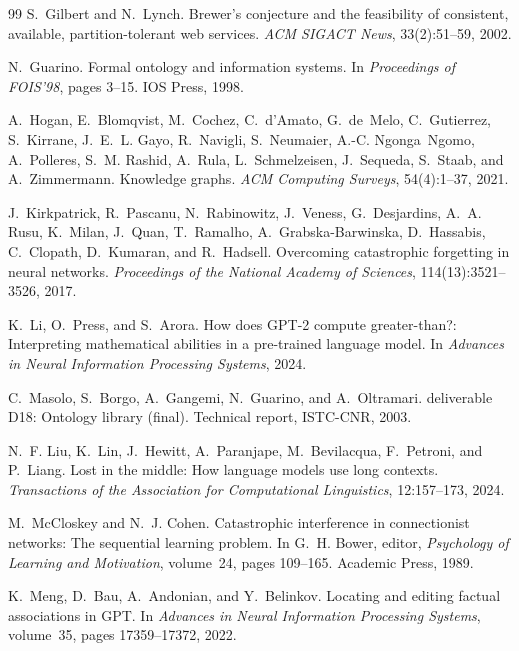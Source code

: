 \documentclass[11pt]{article}
\theoremstyle{definition}
\begin{document}
\begin{thebibliography}{99}
S.~Gilbert and N.~Lynch.
\newblock Brewer's conjecture and the feasibility of consistent, available,
  partition-tolerant web services.
\newblock \emph{ACM SIGACT News}, 33(2):51--59, 2002.

N.~Guarino.
\newblock Formal ontology and information systems.
\newblock In \emph{Proceedings of FOIS'98}, pages 3--15. IOS Press, 1998.

A.~Hogan, E.~Blomqvist, M.~Cochez, C.~d'Amato, G.~de~Melo, C.~Gutierrez,
  S.~Kirrane, J.~E.~L. Gayo, R.~Navigli, S.~Neumaier, A.-C. Ngonga~Ngomo,
  A.~Polleres, S.~M. Rashid, A.~Rula, L.~Schmelzeisen, J.~Sequeda, S.~Staab,
  and A.~Zimmermann.
\newblock Knowledge graphs.
\newblock \emph{ACM Computing Surveys}, 54(4):1--37, 2021.

J.~Kirkpatrick, R.~Pascanu, N.~Rabinowitz, J.~Veness, G.~Desjardins,
  A.~A. Rusu, K.~Milan, J.~Quan, T.~Ramalho, A.~Grabska-Barwinska,
  D.~Hassabis, C.~Clopath, D.~Kumaran, and R.~Hadsell.
\newblock Overcoming catastrophic forgetting in neural networks.
\newblock \emph{Proceedings of the National Academy of Sciences},
  114(13):3521--3526, 2017.

K.~Li, O.~Press, and S.~Arora.
\newblock How does {GPT}-2 compute greater-than?: Interpreting mathematical
  abilities in a pre-trained language model.
\newblock In \emph{Advances in Neural Information Processing Systems}, 2024.

C.~Masolo, S.~Borgo, A.~Gangemi, N.~Guarino, and A.~Oltramari.
 deliverable {D18}: Ontology library (final).
\newblock Technical report, ISTC-CNR, 2003.

N.~F. Liu, K.~Lin, J.~Hewitt, A.~Paranjape, M.~Bevilacqua, F.~Petroni, and
  P.~Liang.
\newblock Lost in the middle: How language models use long contexts.
\newblock \emph{Transactions of the Association for Computational Linguistics},
  12:157--173, 2024.

M.~McCloskey and N.~J. Cohen.
\newblock Catastrophic interference in connectionist networks: The sequential
  learning problem.
\newblock In G.~H. Bower, editor, \emph{Psychology of Learning and Motivation},
  volume~24, pages 109--165. Academic Press, 1989.

K.~Meng, D.~Bau, A.~Andonian, and Y.~Belinkov.
\newblock Locating and editing factual associations in {GPT}.
\newblock In \emph{Advances in Neural Information Processing Systems},
  volume~35, pages 17359--17372, 2022.


\end{thebibliography}
\end{document}
